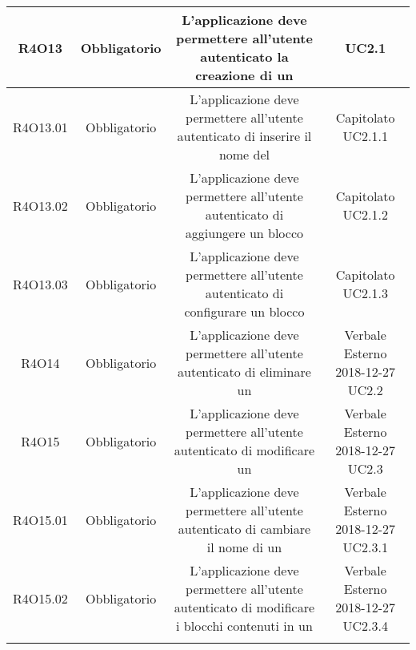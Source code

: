 \begin{tabularx}{\textwidth}{|C|C|C|C|}
	\hline
	R4O13&Obbligatorio&L'applicazione deve permettere all'utente autenticato la creazione di un&  UC2.1\\
	\hline
	R4O13.01&Obbligatorio& L'applicazione deve permettere all'utente autenticato di inserire il nome del  & Capitolato UC2.1.1\\
	\hline
	R4O13.02&Obbligatorio&L'applicazione deve permettere all'utente autenticato di aggiungere un blocco &  Capitolato UC2.1.2\\
	\hline	
	R4O13.03&Obbligatorio&L'applicazione deve permettere all'utente autenticato di configurare un blocco& Capitolato UC2.1.3\\
	\hline
	R4O14&Obbligatorio&L'applicazione deve permettere all'utente autenticato di eliminare un& Verbale Esterno 2018-12-27 UC2.2\\
	\hline
	R4O15&Obbligatorio& L'applicazione deve permettere all'utente autenticato di  modificare un  &Verbale Esterno 2018-12-27 UC2.3\\
	\hline
	R4O15.01&Obbligatorio& L'applicazione deve permettere all'utente autenticato di cambiare il nome di un  &Verbale Esterno 2018-12-27 UC2.3.1\\
	\hline
	R4O15.02&Obbligatorio& L'applicazione deve permettere all'utente autenticato di modificare i blocchi contenuti in un  &Verbale Esterno 2018-12-27 UC2.3.4\\
	\hline
	\caption{Tabella requisiti di vincolo}
\end{tabularx}

\newpage
